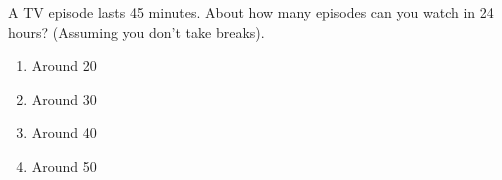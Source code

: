 \documentclass[noauthor]{ximera}
\begin{document}
\begin{exercise}
  A TV episode lasts 45 minutes. About how many episodes can you watch in 24 hours? 
  (Assuming you don't take breaks).
  \begin{multicols}{2}
  \begin{enumerate}
    \item Around 20
    \item Around 30
    \item Around 40
    \item Around 50
   \end{enumerate}
    \end{multicols}
\end{exercise}

\end{document}
